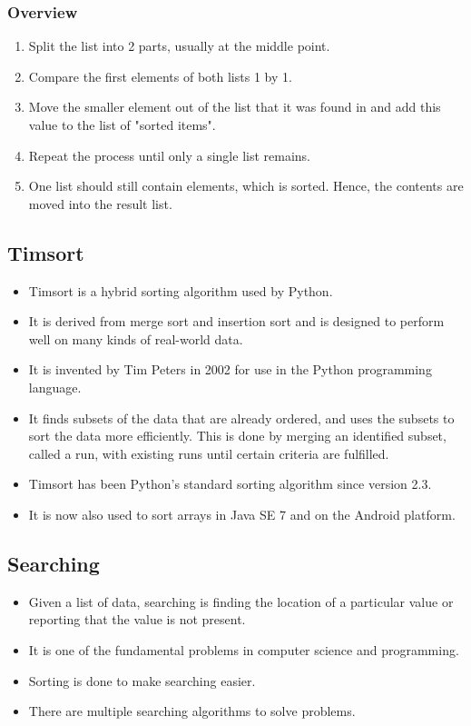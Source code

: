 \documentclass[11pt]{article}
\begin{document}
\subsubsection{Overview}
\label{sec:org10031af}
\begin{enumerate}
\item Split the list into 2 parts, usually at the middle point.
\item Compare the first elements of both lists 1 by 1.
\item Move the smaller element out of the list that it was found in and add this value to the list of "sorted items".
\item Repeat the process until only a single list remains.
\item One list should still contain elements, which is sorted. Hence, the contents are moved into the result list.
\end{enumerate}

\subsection{Timsort}
\label{sec:org33250fe}
\begin{itemize}
\item Timsort is a hybrid sorting algorithm used by Python.
\item It is derived from merge sort and insertion sort and is designed to perform well on many kinds of real-world data.
\item It is invented by Tim Peters in 2002 for use in the Python programming language.
\item It finds subsets of the data that are already ordered, and uses the subsets to sort the data more efficiently. This is done by merging an identified subset, called a run, with existing runs until certain criteria are fulfilled.
\item Timsort has been Python's standard sorting algorithm since version 2.3.
\item It is now also used to sort arrays in Java SE 7 and on the Android platform.
\end{itemize}

\subsection{Searching}
\label{sec:org8c6f6d7}
\begin{itemize}
\item Given a list of data, searching is finding the location of a particular value or reporting that the value is not present.
\item It is one of the fundamental problems in computer science and programming.
\item Sorting is done to make searching easier.
\item There are multiple searching algorithms to solve problems.
\end{itemize}
\end{document}
